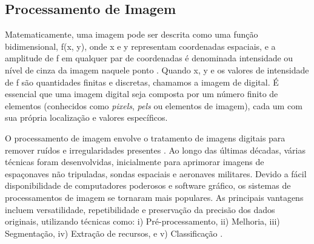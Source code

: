 



\subsection{\esp Processamento de Imagem} \label{procesamentoimg}

Matematicamente, uma imagem pode ser descrita como uma função bidimensional, f(x, y), onde x e y representam coordenadas espaciais, e a amplitude de f em qualquer par de coordenadas é denominada intensidade ou nível de cinza da imagem naquele ponto \cite{techniques}. Quando x, y e os valores de intensidade de f são quantidades finitas e discretas, chamamos a imagem de digital. É essencial que uma imagem digital seja composta por um número finito de elementos (conhecidos como \textit{pixels}, \textit{pels} ou elementos de imagem), cada um com sua própria localização e valores específicos. 

O processamento de imagem envolve o tratamento de imagens digitais para remover ruídos e irregularidades presentes \cite{histopathological}. Ao longo das últimas décadas, várias técnicas foram desenvolvidas, inicialmente para aprimorar imagens de espaçonaves não tripuladas, sondas espaciais e aeronaves militares. Devido a fácil disponibilidade de computadores poderosos e software gráfico, os sistemas de processamentos de imagem se tornaram mais populares. As principais vantagens incluem versatilidade, repetibilidade e preservação da precisão dos dados originais, utilizando técnicas como: i) Pré-processamento, ii) Melhoria, iii) Segmentação, iv) Extração de recursos, e v) Classificação \cite{lungcancer}.

